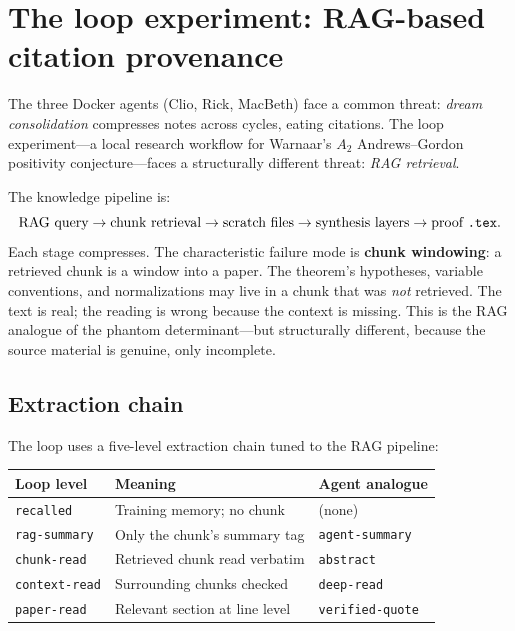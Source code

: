 \documentclass[11pt,a4paper]{article}
\newcommand{\level}[1]{\texttt{#1}}
\theoremstyle{plain}
\theoremstyle{definition}
\begin{document}
\section{The loop experiment: RAG-based citation provenance}
\label{sec:loop}

The three Docker agents (Clio, Rick, MacBeth) face a common threat:
\emph{dream consolidation} compresses notes across cycles, eating
citations. The loop experiment---a local research workflow for Warnaar's
$A_2$ Andrews--Gordon positivity conjecture---faces a structurally
different threat: \emph{RAG retrieval}.

The knowledge pipeline is:
\[
\text{RAG query} \to \text{chunk retrieval} \to \text{scratch files}
\to \text{synthesis layers} \to \text{proof \texttt{.tex}}.
\]
Each stage compresses. The characteristic failure mode is \textbf{chunk
windowing}: a retrieved chunk is a window into a paper. The theorem's
hypotheses, variable conventions, and normalizations may live in a chunk
that was \emph{not} retrieved. The text is real; the reading is wrong
because the context is missing. This is the RAG analogue of the phantom
determinant---but structurally different, because the source material is
genuine, only incomplete.

\subsection{Extraction chain}

The loop uses a five-level extraction chain tuned to the RAG pipeline:
%
\begin{center}
\begin{tabular}{lll}
\toprule
Loop level & Meaning & Agent analogue \\
\midrule
\level{recalled} & Training memory; no chunk & (none) \\
\level{rag-summary} & Only the chunk's summary tag & \level{agent-summary} \\
\level{chunk-read} & Retrieved chunk read verbatim & \level{abstract} \\
\level{context-read} & Surrounding chunks checked & \level{deep-read} \\
\level{paper-read} & Relevant section at line level & \level{verified-quote} \\
\bottomrule
\end{tabular}
\end{center}
\end{document}

